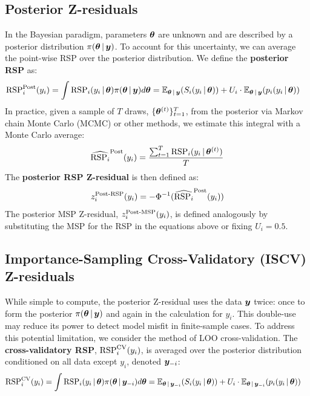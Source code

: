 \subsection{Posterior Z-residuals}\label{ZRESID2}
In the Bayesian paradigm, parameters $\bm{\theta}$ are unknown and are described by a posterior distribution $\pi(\bm{\theta} \,|\, \bm{y})$. To account for this uncertainty, we can average the point-wise RSP over the posterior distribution. We define the \textbf{posterior RSP} as:
\begin{align}
    \text{RSP}_i^{\text{Post}} (y_i) &= \int \text{RSP}_i(y_i \,|\, \bm{\theta})\pi(\bm{\theta} \,|\, \bm{y}) d\bm{\theta}
    =\mathbb{E}_{\bm{\theta}\,|\,\bm{y}}(S_i(y_i\,|\, \bm{\theta}))+U_i \cdot\mathbb{E}_{\bm{\theta}\,|\,\bm{y}}(p_i(y_i\,|\,\bm{\theta}))
\end{align}
In practice, given a sample of $T$ draws, $\{\bm{\theta}^{(t)}\}_{t=1}^T$, from the posterior via Markov chain Monte Carlo (MCMC) or other methods, we estimate this integral with a Monte Carlo average:
\begin{equation} \label{eq-rpp-post-est}
    \widehat{\text{RSP}_i}^{\text{Post}}(y_i) = \frac{\sum_{t=1}^T \text{RSP}_i(y_i \,|\, \bm{\theta}^{(t)})}{T}
\end{equation}
The \textbf{posterior RSP Z-residual} is then defined as:
\begin{equation} \label{eq-post-rpp-zres}
    z_i^{\text{Post-RSP}}(y_i) = -\Phi^{-1}(\widehat{\text{RSP}_i}^{\text{Post}}(y_i))
\end{equation}
The posterior MSP Z-residual, $z_i^{\text{Post-MSP}}(y_i)$, is defined analogously by substituting the MSP for the RSP in the equations above or fixing $U_i=0.5$.


\subsection{Importance-Sampling Cross-Validatory (ISCV) Z-residuals}\label{ZRESID3}
While simple to compute, the posterior Z-residual uses the data $\bm{y}$ twice: once to form the posterior $\pi(\bm{\theta} \,|\, \bm{y})$ and again in the calculation for $y_i$. This double-use may reduce its power to detect model misfit in finite-sample cases. To address this potential limitation, we consider the method of LOO cross-validation. The \textbf{cross-validatory RSP}, $\text{RSP}_i^{\text{CV}}(y_i)$, is averaged over the posterior distribution conditioned on all data except $y_i$, denoted $\bm{y}_{-i}$:
\begin{align}
    \text{RSP}_i^{\text{CV}} (y_i) &= \int \text{RSP}_i(y_i \,|\, \bm{\theta})\pi(\bm{\theta} \,|\, \bm{y}_{-i}) d\bm{\theta} =\mathbb{E}_{\bm{\theta}\,|\,\bm{y}_{-i}}(S_i(y_i\,|\, \bm{\theta}))+U_i\cdot \mathbb{E}_{\bm{\theta}\,|\,\bm{y}_{-i}}(p_i(y_i\,|\,\bm{\theta}))
\end{align}



